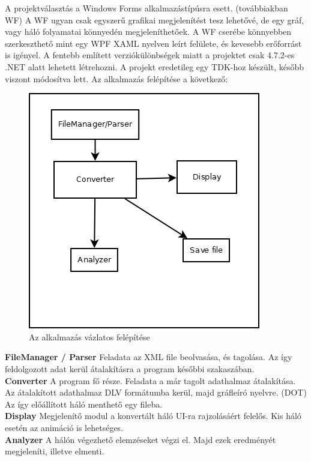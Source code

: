 A projektválasztás a Windows Forms alkalmazástípúsra esett. (továbbiakban WF) A WF ugyan csak egyszerű grafikai megjelenítést tesz lehetővé, de egy gráf, vagy háló folyamatai könnyedén megjeleníthetőek. A WF cserébe könnyebben szerkeszthető mint egy WPF XAML nyelven leírt felülete, és kevesebb erőforrást is igényel. 
\newpage
{}
A fentebb említett verziókülönbségek miatt a projektet csak 4.7.2-es .NET alatt lehetett létrehozni. A projekt eredetileg egy TDK-hoz készült, később viszont módosítva lett. Az alkalmazás felépítése a következő: 

\begin{figure}[h!]
\centering
\includegraphics[scale=0.6]{images/scheme.png}
\caption{Az alkalmazás vázlatos felépítése}
\label{fig:invoke}
\end{figure}

\textbf{FileManager / Parser } Feladata az XML file beolvasása, és tagolása. Az így feldolgozott adat kerül átalakításra a program későbbi szakaszában.\\
\textbf{Converter} A program fő része. Feladata a már tagolt adathalmaz átalakítása. Az átalakított adathalmaz DLV formátumba kerül, majd gráfleíró nyelvre. (DOT) Az így előállított háló menthető egy fileba.\\
\textbf{Display} Megjelenítő modul a konvertált háló UI-ra rajzolásáért felelős. Kis háló esetén az animáció is lehetséges.\\
\textbf{Analyzer} A hálón végezhető elemzéseket végzi el. Majd ezek eredményét megjeleníti, illetve elmenti. 

